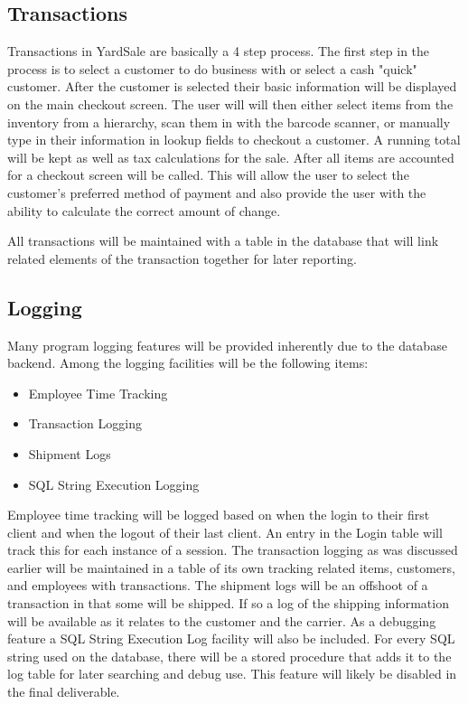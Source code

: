 \documentclass{report}
\begin{document}
\subsection{Transactions}

Transactions in YardSale are basically a 4 step process. The first step in the process is to select a customer to do business with or select a cash "quick" customer. After the customer is selected their basic information will be displayed on the main checkout screen. The user will will then either select items from the inventory from a hierarchy, scan them in with the barcode scanner, or manually type in their information in lookup fields to checkout a customer. A running total will be kept as well as tax calculations for the sale. After all items are accounted for a checkout screen will be called. This will allow the user to select the customer's preferred method of payment and also provide the user with the ability to calculate the correct amount of change.

All transactions will be maintained with a table in the database that will link related elements of the transaction together for later reporting.

\subsection{Logging}

Many program logging features will be provided inherently due to the database backend. Among the logging facilities will be the following items:

\begin{itemize}
\item {Employee Time Tracking}
\item {Transaction Logging}
\item {Shipment Logs}
\item {SQL String Execution Logging}
\end{itemize}

Employee time tracking will be logged based on when the login to their first client and when the logout of their last client. An entry in the Login table will track this for each instance of a session. The transaction logging as was discussed earlier will be maintained in a table of its own tracking related items, customers, and employees with transactions. The shipment logs will be an offshoot of a transaction in that some will be shipped. If so a log of the shipping information will be available as it relates to the customer and the carrier. As a debugging feature a SQL String Execution Log facility will also be included. For every SQL string used on the database, there will be a stored procedure that adds it to the log table for later searching and debug use. This feature will likely be disabled in the final deliverable.
\end{document}
